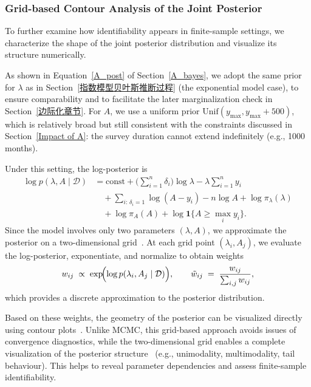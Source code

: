 \subsubsection{Grid-based Contour Analysis of the Joint Posterior}

To further examine how identifiability appears in finite-sample settings, we characterize the shape of the joint posterior distribution and visualize its structure numerically.

As shown in Equation~\eqref{A_post} of Section~\ref{A_bayes}, we adopt the same prior for $\lambda$ as in Section~\ref{指数模型贝叶斯推断过程} (the exponential model case), to ensure comparability and to facilitate the later marginalization check in Section~\ref{边际化章节}. For $A$, we use a uniform prior $\mathrm{Unif}(y_{\max}, y_{\max}+500)$, which is relatively broad but still consistent with the constraints discussed in Section~\ref{Impact of A}: the survey duration cannot extend indefinitely (e.g., 1000 months).

Under this setting, the log-posterior is
\begin{align}
\log p(\lambda, A \mid \mathcal D)
&= \text{const}
   + \Big(\sum_{i=1}^n \delta_i\Big)\log \lambda
   - \lambda \sum_{i=1}^n y_i \nonumber\\[6pt]
&\quad + \sum_{i:\,\delta_i=1}\log(A-y_i)
   - n \log A
   + \log \pi_\lambda(\lambda) \nonumber \\[6pt]
&\quad + \log \pi_A(A) + \log \mathbf 1\{A \ge \max_i y_i\}.
\end{align}
Since the model involves only two parameters $(\lambda, A)$, we approximate the posterior on a two-dimensional grid~\cite{mcelreath2021grid}. At each grid point $(\lambda_i, A_j)$, we evaluate the log-posterior, exponentiate, and normalize to obtain weights~\cite{ORMEROD201145,mcelreath2021grid}
\begin{equation}
    w_{ij} \;\propto\; \exp\!\Bigl(\log p(\lambda_i, A_j \mid \mathcal D)\Bigr), \qquad \tilde w_{ij} \;=\; \frac{w_{ij}}{\sum_{i,j} w_{ij}} ,
\end{equation}
which provides a discrete approximation to the posterior distribution.

Based on these weights, the geometry of the posterior can be visualized directly using contour plots~\cite{maclaren2020estimatedidentifiabilityestimabilitycausal, mcelreath2021grid}. Unlike MCMC, this grid-based approach avoids issues of convergence diagnostics, while the two-dimensional grid enables a complete visualization of the posterior structure~\cite{joshi2016improvinggridbasedbayesian} (e.g., unimodality, multimodality, tail behaviour). This helps to reveal parameter dependencies and assess finite-sample identifiability.

